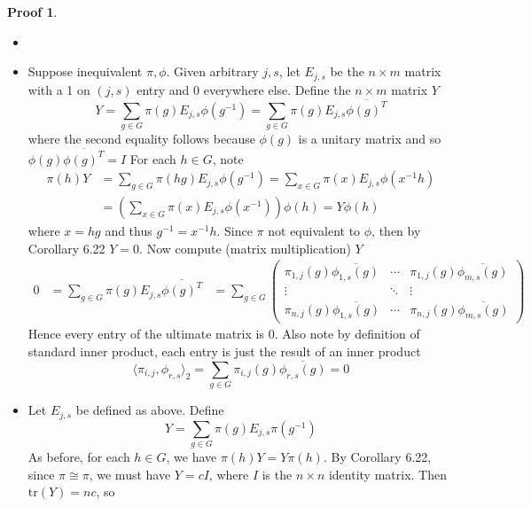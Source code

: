 \documentclass{book}
\newcommand{\inner}[1]{\langle #1 \rangle}
\newcommand{\tr}[1]{\textrm{tr}( #1 )}
\theoremstyle{definition}
\theoremstyle{remarkstyle}
\newtheorem*{myproof}{Proof}%
\begin{document}
\begin{myproof}
    \begin{itemize}
        \item[]
        \item Suppose inequivalent $\pi,\phi$. Given arbitrary $j,s$, let $E_{j,s} $ be the $n\times m$ matrix with a 1 on $(j,s)$ entry and 0 everywhere else. Define the $n\times m$ matrix $Y$
        $$
        Y = \sum_{g\in G}\pi(g)E_{j,s}\phi(g^{-1}) = \sum_{g\in G}\pi(g)E_{j,s}\overline{\phi(g)^{T}}
        $$
        where the second equality follows because $\phi(g)$ is a unitary matrix and so $\phi(g)\overline{\phi(g)^{T}}=I$ \newline
        For each $h\in G$, note
        \begin{align*}
            \pi(h)Y 
            &= \sum_{g\in G}\pi(hg)E_{j,s}\phi(g^{-1}) = \sum_{x\in G}\pi(x)E_{j,s}\phi(x^{-1}h) \\
            &= \left(\sum_{x\in G}\pi(x)E_{j,s}\phi(x^{-1})\right)\phi(h) = Y\phi(h)
        \end{align*}
        where $x=hg$ and thus $g^{-1}=x^{-1}h$. Since $\pi$ not equivalent to $\phi$, then by Corollary 6.22 $Y=0$. Now compute (matrix multiplication) $Y$
        \begin{align*}
            0 &= \sum_{g\in G}\pi(g)E_{j,s}\overline{\phi(g)^{T}}
            &= \sum_{g\in G}\left(
            \begin{array}{ccc}
                \pi_{1,j}(g)\overline{\phi_{1,s}(g)} & \cdots & 
                \pi_{1,j}(g)\overline{\phi_{m,s}(g)}  \\
                \vdots & \ddots & \vdots \\
                \pi_{n,j}(g)\overline{\phi_{1,s}(g)} & \cdots &
                \pi_{n,j}(g)\overline{\phi_{m,s}(g)}
            \end{array}
            \right)
        \end{align*}
        Hence every entry of the ultimate matrix is 0. Also note by definition of standard inner product, each entry is just the result of an inner product
        $$
        \inner{\pi_{i,j},\phi_{r,s}}_2 = \sum_{g\in G}\pi_{i,j}(g)\overline{\phi_{r,s}(g)} = 0
        $$
        \item Let $E_{j,s} $ be defined as above. Define 
        $$
        Y = \sum_{g\in G}\pi(g)E_{j,s}\pi(g^{-1})
        $$
        As before, for each $h\in G$, we have $\pi(h)Y=Y\pi(h)$. By Corollary 6.22, since $\pi\cong\pi$, we must have $Y=cI$, where $I$ is the $n\times n$ identity matrix. Then $\tr{Y}=nc$, so 

\end{itemize}
\end{myproof}
\end{document}
